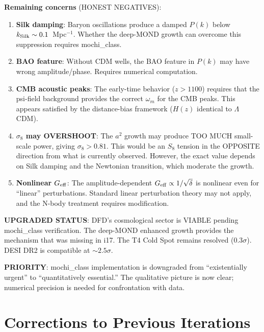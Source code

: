 \documentclass[11pt]{article}
\newcommand{\Geff}{G_{\rm eff}}
\begin{document}
\begin{tcolorbox}[colback=green!5!white, colframe=green!70!black,
  title=\textbf{EXISTENTIAL ASSESSMENT --- UPGRADED FROM ``SERIOUS'' TO ``VIABLE''}]
\textbf{Remaining concerns} (HONEST NEGATIVES):
\begin{enumerate}
\item \textbf{Silk damping}: Baryon oscillations produce a damped
  $P(k)$ below $k_{\rm Silk} \sim 0.1$~Mpc$^{-1}$. Whether the
  deep-MOND growth can overcome this suppression requires mochi\_class.
\item \textbf{BAO feature}: Without CDM wells, the BAO feature in
  $P(k)$ may have wrong amplitude/phase. Requires numerical computation.
\item \textbf{CMB acoustic peaks}: The early-time behavior ($z > 1100$)
  requires that the psi-field background provides the correct
  $\omega_m$ for the CMB peaks. This appears satisfied by the
  distance-bias framework ($H(z)$ identical to $\Lambda$CDM).
\item \textbf{$\sigma_8$ may OVERSHOOT}: The $a^2$ growth may produce
  TOO MUCH small-scale power, giving $\sigma_8 > 0.81$. This would
  be an $S_8$ tension in the OPPOSITE direction from what is currently
  observed. However, the exact value depends on Silk damping and the
  Newtonian transition, which moderate the growth.
\item \textbf{Nonlinear $\Geff$}: The amplitude-dependent
  $\Geff \propto 1/\sqrt{\delta}$ is nonlinear even for ``linear''
  perturbations. Standard linear perturbation theory may not apply,
  and the N-body treatment requires modification.
\end{enumerate}

\textbf{UPGRADED STATUS}: DFD's cosmological sector is VIABLE pending
mochi\_class verification. The deep-MOND enhanced growth provides
the mechanism that was missing in i17. The T4 Cold Spot remains
resolved (0.3$\sigma$). DESI DR2 is compatible at $\sim 2.5\sigma$.

\textbf{PRIORITY}: mochi\_class implementation is downgraded from
``existentially urgent'' to ``quantitatively essential.'' The
qualitative picture is now clear; numerical precision is needed for
confrontation with data.
\end{tcolorbox}


\section*{Corrections to Previous Iterations}
\end{document}
